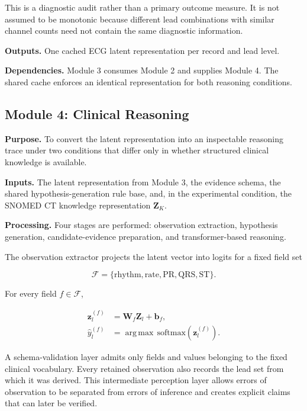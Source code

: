 \documentclass{ssnreview}
\begin{document}
This is a diagnostic audit rather than a primary outcome measure. It is not assumed to be
monotonic because different lead combinations with similar channel counts need not
contain the same diagnostic information.

\textbf{Outputs.} One cached ECG latent representation per record and lead level.

\textbf{Dependencies.} Module 3 consumes Module 2 and supplies Module 4. The shared
cache enforces an identical representation for both reasoning conditions.

\subsection{Module 4: Clinical Reasoning}

\textbf{Purpose.} To convert the latent representation into an inspectable reasoning
trace under two conditions that differ only in whether structured clinical knowledge is
available.

\textbf{Inputs.} The latent representation from Module 3, the evidence schema, the
shared hypothesis-generation rule base, and, in the experimental condition, the
SNOMED CT knowledge representation $\mathbf{Z}_K$.

\textbf{Processing.} Four stages are performed: observation extraction, hypothesis
generation, candidate-evidence preparation, and transformer-based reasoning.

The observation extractor projects the latent vector into logits for a fixed field set

\begin{equation}
  \mathcal{F}=\{\text{rhythm},\text{rate},\text{PR},\text{QRS},\text{ST}\}.
\end{equation}

For every field $f\in\mathcal{F}$,

\begin{align}
  \mathbf{z}^{(f)}_l &=\mathbf{W}_f\mathbf{Z}_l+\mathbf{b}_f,
  \label{eq:obs-logits}\\
  \widehat{y}^{(f)}_l
  &=\mathop{\mathrm{arg\,max}}\,
  \mathrm{softmax}\!\left(\mathbf{z}^{(f)}_l\right).
  \label{eq:obs-class}
\end{align}

A schema-validation layer admits only fields and values belonging to the fixed clinical
vocabulary. Every retained observation also records the lead set from which it was
derived. This intermediate perception layer allows errors of observation to be separated
from errors of inference and creates explicit claims that can later be verified.
\end{document}
